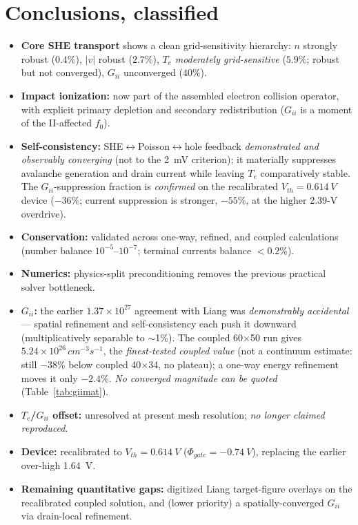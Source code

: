 \documentclass[11pt]{article}
\begin{document}
\section{Conclusions, classified}\label{sec:concl}
\begin{itemize}[leftmargin=1.4em,itemsep=2pt]
\item \textbf{Core SHE transport} shows a clean grid-sensitivity hierarchy: $n$ strongly robust
($0.4\%$), $|v|$ robust ($2.7\%$), $T_e$ \emph{moderately grid-sensitive} ($5.9\%$; robust but not
converged), $G_{ii}$ unconverged ($40\%$).
\item \textbf{Impact ionization:} now part of the assembled electron collision operator, with
explicit primary depletion and secondary redistribution ($G_{ii}$ is a moment of the II-affected
$f_0$).
\item \textbf{Self-consistency:} SHE$\leftrightarrow$Poisson$\leftrightarrow$hole feedback
\emph{demonstrated and observably converging} (not to the \SI{2}{mV} criterion); it materially
suppresses avalanche generation and drain current while leaving $T_e$ comparatively stable.
The $G_{ii}$-suppression fraction is \emph{confirmed} on the recalibrated $V_{th}=\SI{0.614}{V}$
device ($-36\%$; current suppression is stronger, $-55\%$, at the higher 2.39-V overdrive).
\item \textbf{Conservation:} validated across one-way, refined, and coupled calculations
(number balance $10^{-5}$--$10^{-7}$; terminal currents balance $<0.2\%$).
\item \textbf{Numerics:} physics-split preconditioning removes the previous practical solver
bottleneck.
\item \textbf{$G_{ii}$:} the earlier $1.37\times10^{27}$ agreement with Liang was
\emph{demonstrably accidental} --- spatial refinement and self-consistency each push it downward
(multiplicatively separable to $\sim$1\%). The coupled 60$\times$50 run gives
$5.24\times10^{26}\,\si{cm^{-3}s^{-1}}$, the \emph{finest-tested coupled value} (not a continuum
estimate: still $-38\%$ below coupled 40$\times$34, no plateau); a one-way energy refinement moves
it only $-2.4\%$. \emph{No converged magnitude can be quoted} (Table~\ref{tab:giimat}).
\item \textbf{$T_e$/$G_{ii}$ offset:} unresolved at present mesh resolution; \emph{no longer
claimed reproduced}.
\item \textbf{Device:} recalibrated to $V_{th}=\SI{0.614}{V}$ ($\Phi_{gate}=\SI{-0.74}{V}$),
replacing the earlier over-high \SI{1.64}{V}.
\item \textbf{Remaining quantitative gaps:} digitized Liang target-figure overlays on the
recalibrated coupled solution, and (lower priority) a spatially-converged $G_{ii}$ via
drain-local refinement.
\end{itemize}
\end{document}
